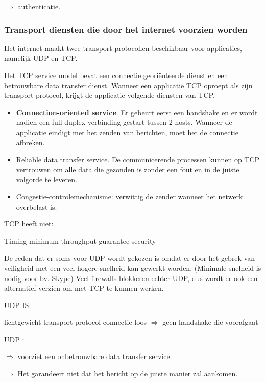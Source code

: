 \noindent $\Rightarrow$ authenticatie.

\subsubsection{Transport diensten die door het internet voorzien worden}

\noindent Het internet maakt twee transport protocollen beschikbaar voor applicaties, namelijk UDP en TCP.


Het TCP service model bevat een connectie georiënteerde dienst en een betrouwbare data transfer dienst. Wanneer een applicatie TCP oproept als zijn transport protocol, krijgt de applicatie volgende diensten van TCP.
\begin{itemize}
    \item \textbf{Connection-oriented service}. 
    Er gebeurt eerst een handshake en er wordt nadien een full-duplex verbinding gestart tussen 2 hosts. Wanneer de applicatie eindigt met het zenden van berichten, moet het de connectie afbreken.
    \item Reliable data transfer service. De communicerende processen kunnen op TCP vertrouwen om alle data die gezonden is zonder een fout en in de juiste volgorde te leveren.
    \item Congestie-controlemechanisme: verwittig de zender wanneer het netwerk overbelast is.
\end{itemize}

\noindent TCP heeft niet:

\bi
\itf Timing
\itf minimum throughput guarantee
\itf security
\ei


De reden dat er soms voor UDP wordt gekozen is omdat er door het gebrek van veiligheid met een veel hogere snelheid kan gewerkt worden. (Minimale snelheid is nodig voor bv. Skype) Veel firewalls blokkeren echter UDP, dus wordt er ook een alternatief verzien om met TCP te kunnen werken.

\noindent UDP IS:

\bi
\itf lichtgewicht transport protocol
\itf connectie-loos $\Rightarrow$ geen handshake die voorafgaat 
\ei

\noindent UDP :

\noindent $\Rightarrow$ voorziet een onbetrouwbare data transfer service.

\noindent $\Rightarrow$ Het garandeert niet dat het bericht op de juiste manier zal aankomen.

